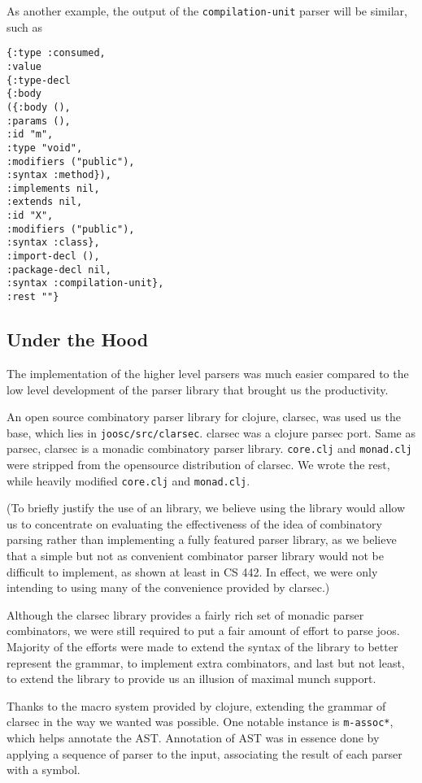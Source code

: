 \documentclass[12pt]{article}
\begin{document}
As another example, the output of the \texttt{compilation-unit} parser will be
similar, such as

\begin{samepage}
\begin{verbatim}
{:type :consumed,
:value
{:type-decl
{:body
({:body (),
:params (),
:id "m",
:type "void",
:modifiers ("public"),
:syntax :method}),
:implements nil,
:extends nil,
:id "X",
:modifiers ("public"),
:syntax :class},
:import-decl (),
:package-decl nil,
:syntax :compilation-unit},
:rest ""}
\end{verbatim}
\end{samepage}

\subsection{Under the Hood}

The implementation of the higher level parsers was much easier compared to the
low level development of the parser library that brought us the productivity.

An open source combinatory parser library for clojure, clarsec, was used us the
base, which lies in \texttt{joosc/src/clarsec}. clarsec was a clojure parsec
port. Same as parsec, clarsec is a monadic combinatory parser
library. \texttt{core.clj} and \texttt{monad.clj} were stripped from the
opensource distribution of clarsec. We wrote the rest, while heavily modified
\texttt{core.clj} and \texttt{monad.clj}.

(To briefly justify the use of an library, we believe using the library would
allow us to concentrate on evaluating the effectiveness of the idea of
combinatory parsing rather than implementing a fully featured parser library, as
we believe that a simple but not as convenient combinator parser library would
not be difficult to implement, as shown at least in CS 442. In effect, we were
only intending to using many of the convenience provided by clarsec.)

Although the clarsec library provides a fairly rich set of monadic parser
combinators, we were still required to put a fair amount of effort to parse
joos. Majority of the efforts were made to extend the syntax of the library to
better represent the grammar, to implement extra combinators, and last but not
least, to extend the library to provide us an illusion of maximal munch support.

Thanks to the macro system provided by clojure, extending the grammar of clarsec
in the way we wanted was possible. One notable instance is \texttt{m-assoc*},
which helps annotate the AST. Annotation of AST was in essence done by applying
a sequence of parser to the input, associating the result of each parser with a
symbol.
\end{document}
